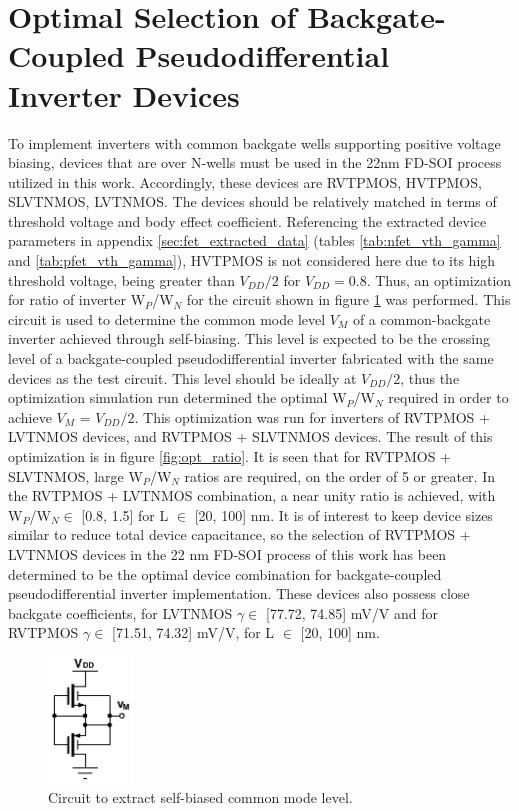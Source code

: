 	\FloatBarrier\section{Optimal Selection of Backgate-Coupled Pseudodifferential Inverter Devices}\label{sec:opt_wp_wn}
		To implement inverters with common backgate wells supporting positive voltage biasing, devices that are over N-wells must be used in the 22nm FD-SOI process utilized in this work. Accordingly, these devices are RVTPMOS, HVTPMOS, SLVTNMOS, LVTNMOS. The devices should be relatively matched in terms of threshold voltage and body effect coefficient. Referencing the extracted device parameters in appendix \ref{sec:fet_extracted_data} (tables \ref{tab:nfet_vth_gamma} and \ref{tab:pfet_vth_gamma}), HVTPMOS is not considered here due to its high threshold voltage, being greater than $V_{DD}/2$ for $V_{DD}=0.8$. Thus, an optimization for ratio of inverter W$_P$/W$_N$ for the circuit shown in figure \ref{fig:inv_vm} was performed. This circuit is used to determine the common mode level $V_{M}$ of a common-backgate inverter achieved through self-biasing. This level is expected to be the crossing level of a backgate-coupled pseudodifferential inverter fabricated with the same devices as the test circuit. This level should be ideally at $V_{DD}/2$, thus the optimization simulation run determined the optimal W$_P$/W$_N$ required in order to achieve $V_{M}$ = $V_{DD}/2$. This optimization was run for inverters of RVTPMOS + LVTNMOS devices, and RVTPMOS + SLVTNMOS devices. The result of this optimization is in figure \ref{fig:opt_ratio}. It is seen that for RVTPMOS + SLVTNMOS, large W$_P$/W$_N$ ratios are required, on the order of 5 or greater. In the RVTPMOS + LVTNMOS combination, a near unity ratio is achieved, with W$_P$/W$_N \in$ [0.8, 1.5] for L $\in$ [20, 100] nm. It is of interest to keep device sizes similar to reduce total device capacitance, so the selection of RVTPMOS + LVTNMOS devices in the 22 nm FD-SOI process of this work has been determined to be the optimal device combination for backgate-coupled pseudodifferential inverter implementation. These devices also possess close backgate coefficients, for LVTNMOS $\gamma \in$ [77.72, 74.85] mV/V and for RVTPMOS $\gamma \in$ [71.51, 74.32] mV/V, for L $\in$ [20, 100] nm. 

			\begin{figure}[htb!]
			        \centering
			        \includegraphics[width=0.2\textwidth, angle=0]{./figs/design/inv_vm}
			    \caption{Circuit to extract self-biased common mode level.}
			    \label{fig:inv_vm}
			\end{figure}

